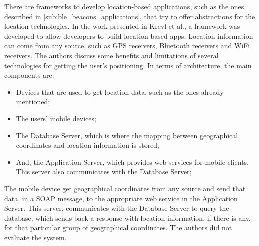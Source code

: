 There are frameworks to develop location-based
applications, such as the ones described in
\ref{sub:ble_beacons_applications}, that
try to offer abstractions for the location
technologies.
In the work presented in Krevl et al.\cite{Krevl2006}, 
a framework
was developed to allow developers to build
location-based apps. Location information can come
from any source, such as GPS receivers, Bluetooth
receivers and WiFi receivers.
The authors discuss some benefits and limitations
of several technologies for getting the
user's positioning.
In terms of architecture, the main components
are:
\begin{itemize}
\item
Devices that are used to get location data, such as
the ones already mentioned;
\item The users' mobile devices;
\item The Database Server, which is where the mapping
between geographical coordinates and location
information is stored;
\item And, the Application Server, which provides web services for
mobile clients. This server also communicates
with the Database Server;
\end{itemize}
The mobile device get geographical coordinates
from any source and send that data, in a
SOAP\cite{Seely:2001:SCP:560836} message,
to the appropriate web service in the Application
Server. This server, communicates with the Database Server
to query the database, which sends back a response with
location information, if there is any, for that
particular group of geographical coordinates.
The authors did not evaluate the system.

